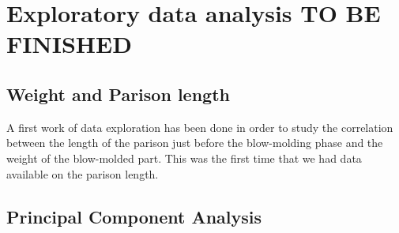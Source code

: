 




\section{Exploratory data analysis TO BE FINISHED}


\subsection{Weight and Parison length}

A first work of data exploration has been done in order to study the correlation between the length of the parison just before the blow-molding phase and the weight of the blow-molded part. This was the first time that we had data available on the parison length. 

\subsection{Principal Component Analysis} \label{}

